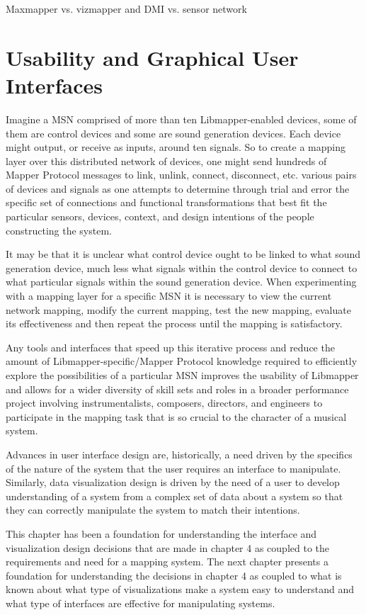 Maxmapper vs. vizmapper and DMI vs. sensor network

\section{Usability and Graphical User Interfaces}

Imagine a MSN comprised of more than ten Libmapper-enabled devices, some of them are control devices and some are sound generation devices. Each device might output, or receive as inputs, around ten signals. So to create a mapping layer over this distributed network of devices, one might send hundreds of Mapper Protocol messages to link, unlink, connect, disconnect, etc. various pairs of devices and signals as one attempts to determine through trial and error the specific set of connections and functional transformations that best fit the particular sensors, devices, context, and design intentions of the people constructing the system. 

It may be that it is unclear what control device ought to be linked to what sound generation device, much less what signals within the control device to connect to what particular signals within the sound generation device. When experimenting with a mapping layer for a specific MSN it is necessary to view the current network mapping, modify the current mapping, test the new mapping, evaluate its effectiveness and then repeat the process until the mapping is satisfactory. 

Any tools and interfaces that speed up this iterative process and reduce the amount of Libmapper-specific/Mapper Protocol knowledge required to efficiently explore the possibilities of a particular MSN improves the usability of Libmapper and allows for a wider diversity of skill sets and roles in a broader performance project involving instrumentalists, composers, directors, and engineers to participate in the mapping task that is so crucial to the character of a musical system. 

Advances in user interface design are, historically, a need driven by the specifics of the nature of the system that the user requires an interface to manipulate. Similarly, data visualization design is driven by the need of a user to develop understanding of a system from a complex set of data about a system so that they can correctly manipulate the system to match their intentions. 

This chapter has been a foundation for understanding the interface and visualization design decisions that are made in chapter 4 as coupled to the requirements and need for a mapping system. The next chapter presents a foundation for understanding the decisions in chapter 4 as coupled to what is known about what type of visualizations make a system easy to understand and what type of interfaces are effective for manipulating systems.

